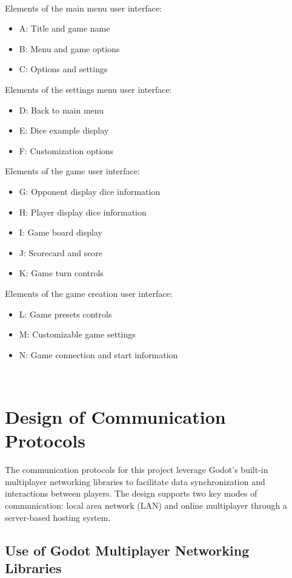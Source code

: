 \documentclass[12pt, titlepage]{article}
\begin{document}
~
\newpage
~
\newpage

\noindent
Elements of the main menu user interface:
\begin{itemize}
  \item A: Title and game name
  \item B: Menu and game options
  \item C: Options and settings
\end{itemize}
Elements of the settings menu user interface:
\begin{itemize}
  \item D: Back to main menu
  \item E: Dice example display
  \item F: Customization options
\end{itemize}
Elements of the game user interface:
\begin{itemize}
  \item G: Opponent display dice information
  \item H: Player display dice information
  \item I: Game board display
  \item J: Scorecard and score
  \item K: Game turn controls
\end{itemize}
Elements of the game creation user interface:
\begin{itemize}
  \item L: Game presets controls
  \item M: Customizable game settings
  \item N: Game connection and start information
\end{itemize}









~\newpage
\section{Design of Communication Protocols}

The communication protocols for this project leverage Godot's built-in multiplayer networking libraries to facilitate data synchronization and interactions between players. The design supports two key modes of communication: local area network (LAN) and online multiplayer through a server-based hosting system.

\subsection{Use of Godot Multiplayer Networking Libraries}
\end{document}
